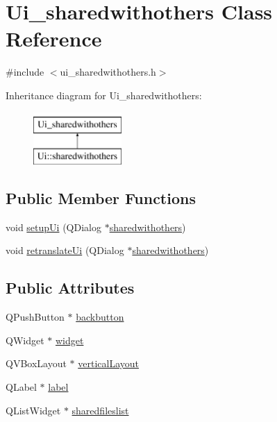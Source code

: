 \hypertarget{classUi__sharedwithothers}{\section{Ui\-\_\-sharedwithothers Class Reference}
\label{classUi__sharedwithothers}
}


{\ttfamily \#include $<$ui\-\_\-sharedwithothers.\-h$>$}

Inheritance diagram for Ui\-\_\-sharedwithothers\-:\begin{figure}[H]
\begin{center}
\leavevmode
\includegraphics[height=2.000000cm]{classUi__sharedwithothers}
\end{center}
\end{figure}
\subsection*{Public Member Functions}
\begin{DoxyCompactItemize}
\item 
void \hyperlink{classUi__sharedwithothers_a945f390dab1933e29620c7aa2aa22a97}{setup\-Ui} (Q\-Dialog $\ast$\hyperlink{classsharedwithothers}{sharedwithothers})
\item 
void \hyperlink{classUi__sharedwithothers_a17bcb48c255fe7d96dab4f9124e0997e}{retranslate\-Ui} (Q\-Dialog $\ast$\hyperlink{classsharedwithothers}{sharedwithothers})
\end{DoxyCompactItemize}
\subsection*{Public Attributes}
\begin{DoxyCompactItemize}
\item 
Q\-Push\-Button $\ast$ \hyperlink{classUi__sharedwithothers_a2e596f92e08f9a59570e42e07752be63}{backbutton}
\item 
Q\-Widget $\ast$ \hyperlink{classUi__sharedwithothers_a4c922607e7b7bded9c5d8ee1af1deb98}{widget}
\item 
Q\-V\-Box\-Layout $\ast$ \hyperlink{classUi__sharedwithothers_af0d5af813471fcf9d32f00bec4188886}{vertical\-Layout}
\item 
Q\-Label $\ast$ \hyperlink{classUi__sharedwithothers_ab09e33109df581cc46e9a8d6ded6623d}{label}
\item 
Q\-List\-Widget $\ast$ \hyperlink{classUi__sharedwithothers_a004737ad9b1a45ebb50825ab793c9546}{sharedfileslist}
\end{DoxyCompactItemize}


